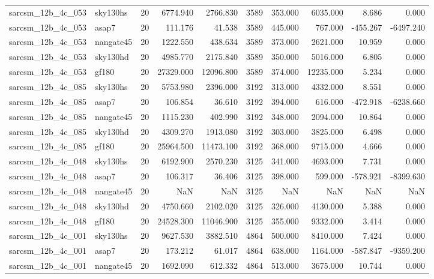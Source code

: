 \begin{tabular}{llrrrrrrrr}
sarcsm\_12b\_4c\_053 & sky130hs & 20 & 6774.940 & 2766.830 & 3589 & 353.000 & 6035.000 & 8.686 & 0.000 \\
sarcsm\_12b\_4c\_053 & asap7 & 20 & 111.176 & 41.538 & 3589 & 445.000 & 767.000 & -455.267 & -6497.240 \\
sarcsm\_12b\_4c\_053 & nangate45 & 20 & 1222.550 & 438.634 & 3589 & 373.000 & 2621.000 & 10.959 & 0.000 \\
sarcsm\_12b\_4c\_053 & sky130hd & 20 & 4985.770 & 2175.840 & 3589 & 350.000 & 5016.000 & 6.805 & 0.000 \\
sarcsm\_12b\_4c\_053 & gf180 & 20 & 27329.000 & 12096.800 & 3589 & 374.000 & 12235.000 & 5.234 & 0.000 \\
sarcsm\_12b\_4c\_085 & sky130hs & 20 & 5753.980 & 2396.000 & 3192 & 313.000 & 4332.000 & 8.551 & 0.000 \\
sarcsm\_12b\_4c\_085 & asap7 & 20 & 106.854 & 36.610 & 3192 & 394.000 & 616.000 & -472.918 & -6238.660 \\
sarcsm\_12b\_4c\_085 & nangate45 & 20 & 1115.230 & 402.990 & 3192 & 348.000 & 2094.000 & 10.864 & 0.000 \\
sarcsm\_12b\_4c\_085 & sky130hd & 20 & 4309.270 & 1913.080 & 3192 & 303.000 & 3825.000 & 6.498 & 0.000 \\
sarcsm\_12b\_4c\_085 & gf180 & 20 & 25964.500 & 11473.100 & 3192 & 368.000 & 9715.000 & 4.666 & 0.000 \\
sarcsm\_12b\_4c\_048 & sky130hs & 20 & 6192.900 & 2570.230 & 3125 & 341.000 & 4693.000 & 7.731 & 0.000 \\
sarcsm\_12b\_4c\_048 & asap7 & 20 & 106.317 & 36.406 & 3125 & 398.000 & 599.000 & -578.921 & -8399.630 \\
sarcsm\_12b\_4c\_048 & nangate45 & 20 & NaN & NaN & 3125 & NaN & NaN & NaN & NaN \\
sarcsm\_12b\_4c\_048 & sky130hd & 20 & 4750.660 & 2102.020 & 3125 & 326.000 & 4130.000 & 5.388 & 0.000 \\
sarcsm\_12b\_4c\_048 & gf180 & 20 & 24528.300 & 11046.900 & 3125 & 355.000 & 9332.000 & 3.414 & 0.000 \\
sarcsm\_12b\_4c\_001 & sky130hs & 20 & 9627.530 & 3882.510 & 4864 & 500.000 & 8410.000 & 7.424 & 0.000 \\
sarcsm\_12b\_4c\_001 & asap7 & 20 & 173.212 & 61.017 & 4864 & 638.000 & 1164.000 & -587.847 & -9359.200 \\
sarcsm\_12b\_4c\_001 & nangate45 & 20 & 1692.090 & 612.332 & 4864 & 513.000 & 3675.000 & 10.744 & 0.000 \\

\end{tabular}
